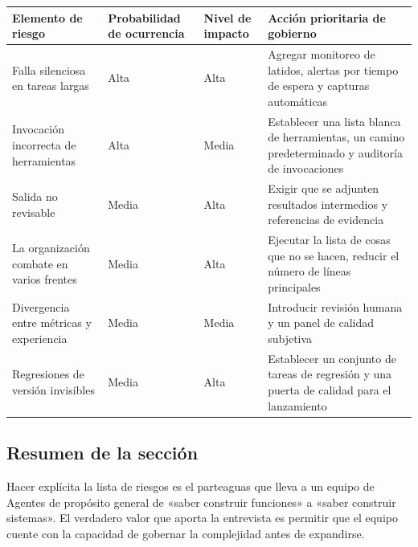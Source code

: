 \begin{center}
\begin{tabular}{p{3.2cm}p{2.1cm}p{2.1cm}p{5.4cm}}
\toprule
Elemento de riesgo & Probabilidad de ocurrencia & Nivel de impacto & Acción prioritaria de gobierno \\
\midrule
Falla silenciosa en tareas largas & Alta & Alta & Agregar monitoreo de latidos, alertas por tiempo de espera y capturas automáticas \\
Invocación incorrecta de herramientas & Alta & Media & Establecer una lista blanca de herramientas, un camino predeterminado y auditoría de invocaciones \\
Salida no revisable & Media & Alta & Exigir que se adjunten resultados intermedios y referencias de evidencia \\
La organización combate en varios frentes & Media & Alta & Ejecutar la lista de cosas que no se hacen, reducir el número de líneas principales \\
Divergencia entre métricas y experiencia & Media & Media & Introducir revisión humana y un panel de calidad subjetiva \\
Regresiones de versión invisibles & Media & Alta & Establecer un conjunto de tareas de regresión y una puerta de calidad para el lanzamiento \\
\bottomrule
\end{tabular}
\end{center}

\subsection{Resumen de la sección}

Hacer explícita la lista de riesgos es el parteaguas que lleva a un equipo de Agentes de propósito general de «saber construir funciones» a «saber construir sistemas». El verdadero valor que aporta la entrevista es permitir que el equipo cuente con la capacidad de gobernar la complejidad antes de expandirse.

